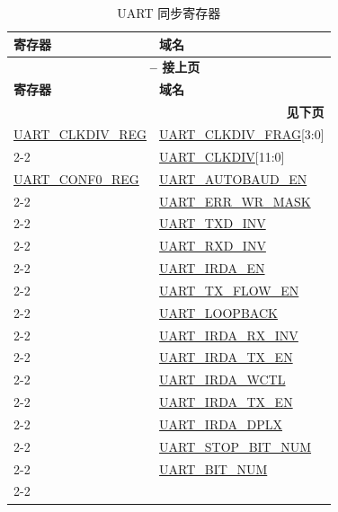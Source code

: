 \documentclass[main\_\_CN.tex]{subfiles}
\begin{document}
\begin{longtable}[c]{|p{6cm}|p{6cm}|}
\caption{UART 同步寄存器}
\label{tab:uart-sync-reg} \\
    \hline
    \rowcolor{lightgray}
    \textbf{寄存器} & \textbf{域名} \\\hline
    \endfirsthead

    \multicolumn{2}{c}{\bfseries \tablename\ \thetable{} -- 接上页}\\\hline
    \rowcolor{lightgray}
    \textbf{寄存器} & \textbf{域名} \\\hline
    \endhead

    \multicolumn{2}{r}{\textbf{见下页}} \\
    \endfoot
    \endlastfoot

\hyperref[regdesc:UARTCLKDIVREG]{UART\_CLKDIV\_REG} & \hyperref[fielddesc:UARTCLKDIVFRAG]{UART\_CLKDIV\_FRAG}[3:0] \\\cline{2-2}
 & \hyperref[fielddesc:UARTCLKDIV]{UART\_CLKDIV}[11:0] \\\hline
\hyperref[regdesc:UARTCONF0REG]{UART\_CONF0\_REG}  & \hyperref[fielddesc:UARTAUTOBAUDEN]{UART\_AUTOBAUD\_EN} \\\cline{2-2}
 & \hyperref[fielddesc:UARTERRWRMASK]{UART\_ERR\_WR\_MASK} \\\cline{2-2}
 & \hyperref[fielddesc:UARTTXDINV]{UART\_TXD\_INV} \\\cline{2-2}
 & \hyperref[fielddesc:UARTRXDINV]{UART\_RXD\_INV} \\\cline{2-2}
 & \hyperref[fielddesc:UARTIRDAEN]{UART\_IRDA\_EN} \\\cline{2-2}
 & \hyperref[fielddesc:UARTTXFLOWEN]{UART\_TX\_FLOW\_EN} \\\cline{2-2}
 & \hyperref[fielddesc:UARTLOOPBACK]{UART\_LOOPBACK} \\\cline{2-2}
 & \hyperref[fielddesc:UARTIRDARXINV]{UART\_IRDA\_RX\_INV} \\\cline{2-2}
 & \hyperref[fielddesc:UARTIRDATXEN]{UART\_IRDA\_TX\_EN} \\\cline{2-2}
 & \hyperref[fielddesc:UARTIRDAWCTL]{UART\_IRDA\_WCTL} \\\cline{2-2}
 & \hyperref[fielddesc:UARTIRDATXEN]{UART\_IRDA\_TX\_EN} \\\cline{2-2}
 & \hyperref[fielddesc:UARTIRDADPLX]{UART\_IRDA\_DPLX} \\\cline{2-2}
 & \hyperref[fielddesc:UARTSTOPBITNUM]{UART\_STOP\_BIT\_NUM} \\\cline{2-2}
 & \hyperref[fielddesc:UARTBITNUM]{UART\_BIT\_NUM} \\\cline{2-2}

\end{longtable}
\end{document}
